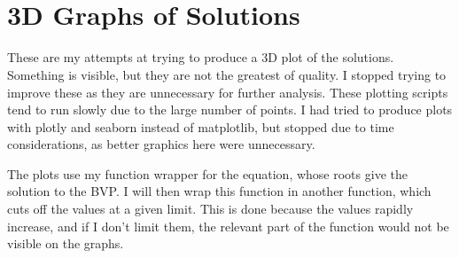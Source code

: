\documentclass[11pt]{article}
\begin{document}
    \begin{center}
    \end{center}
    { \hspace*{\fill} \\}
    
    \begin{center}
    \end{center}
    { \hspace*{\fill} \\}
    
    \hypertarget{d-graphs-of-solutions}{%
\section{3D Graphs of Solutions}\label{d-graphs-of-solutions}}

    These are my attempts at trying to produce a 3D plot of the solutions.
Something is visible, but they are not the greatest of quality. I
stopped trying to improve these as they are unnecessary for further
analysis. These plotting scripts tend to run slowly due to the large
number of points. I had tried to produce plots with plotly and seaborn
instead of matplotlib, but stopped due to time considerations, as better
graphics here were unnecessary.

    The plots use my function wrapper for the equation, whose roots give the
solution to the BVP. I will then wrap this function in another function,
which cuts off the values at a given limit. This is done because the
values rapidly increase, and if I don't limit them, the relevant part of
the function would not be visible on the graphs.
\end{document}
